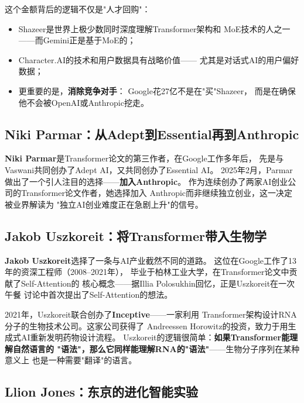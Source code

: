 \begin{whybox}
这个金额背后的逻辑不仅是"人才回购"：
\begin{itemize}
  \item Shazeer是世界上极少数同时深度理解Transformer架构和
    MoE技术的人之一——而Gemini正是基于MoE的；
  \item Character.AI的技术和用户数据具有战略价值——
    尤其是对话式AI的用户偏好数据；
  \item 更重要的是，\textbf{消除竞争对手}：
    Google花27亿不是在"买"Shazeer，
    而是在确保他不会被OpenAI或Anthropic挖走。
\end{itemize}
\end{whybox}

\subsection{Niki Parmar：从Adept到Essential再到Anthropic}

\textbf{Niki Parmar}是Transformer论文的第三作者，在Google工作多年后，
先是与Vaswani共同创办了Adept AI，又共同创办了Essential AI。
2025年2月，Parmar做出了一个引人注目的选择——\textbf{加入Anthropic}。
作为连续创办了两家AI创业公司的Transformer论文作者，她选择加入
Anthropic而非继续独立创业，这一决定被业界解读为
"独立AI创业难度正在急剧上升"的信号。

\subsection{Jakob Uszkoreit：将Transformer带入生物学}

\textbf{Jakob Uszkoreit}选择了一条与AI产业截然不同的道路。
这位在Google工作了13年的资深工程师（2008--2021年），
毕业于柏林工业大学，在Transformer论文中贡献了Self-Attention的
核心概念——据Illia Polosukhin回忆，正是Uszkoreit在一次午餐
讨论中首次提出了Self-Attention的想法。

2021年，Uszkoreit联合创办了\textbf{Inceptive}——一家利用
Transformer架构设计RNA分子的生物技术公司。这家公司获得了
Andreessen Horowitz的投资，致力于用生成式AI重新发明药物设计流程。
Uszkoreit的逻辑很简单：\textbf{如果Transformer能理解自然语言的
"语法"，那么它同样能理解RNA的"语法"}——生物分子序列在某种意义上
也是一种需要"翻译"的语言。

\subsection{Llion Jones：东京的进化智能实验}

